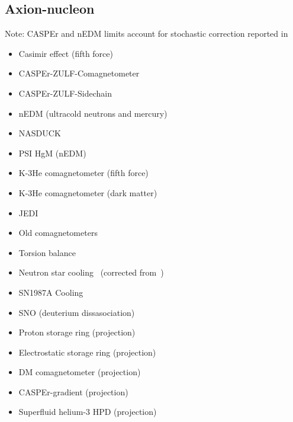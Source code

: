 \documentclass[8pt,twocolumn]{extarticle}
\begin{document}
\begin{mdframed}
\vspace{-1em}
\section{Axion-nucleon}\vspace{-0.5em}
Note: CASPEr and nEDM limits account for stochastic correction reported in~\cite{Centers:2019dyn}
\begin{itemize}\setlength\itemsep{-0.5em}
	\item Casimir effect (fifth force)~\cite{Mostepanenko:2020lqe}
    \item CASPEr-ZULF-Comagnetometer~\cite{Wu:2019exd}
    \item CASPEr-ZULF-Sidechain~\cite{Garcon:2019inh}
    \item nEDM (ultracold neutrons and mercury)~\cite{Abel:2017rtm}
    \item NASDUCK~\cite{Bloch:2021vnn,Bloch:2022kjm}
    \item PSI HgM (nEDM)~\cite{Abel:2022vfg}
    \item K-3He comagnetometer (fifth force)~\cite{Vasilakis2009}
    \item K-3He comagnetometer (dark matter)~\cite{Lee:2022vvb}
    	\item JEDI~\cite{JEDI:2022hxa}
    \item Old comagnetometers~\cite{Bloch:2019lcy}
    \item Torsion balance~\cite{Adelberger:2006dh}
    \item Neutron star cooling~\cite{Buschmann:2021juv} (corrected from~\cite{Beznogov:2018fda})
    \item SN1987A Cooling~\cite{Carenza:2019pxu}
    \item SNO (deuterium dissasociation)~\cite{Bhusal:2020bvx}
    \item Proton storage ring (projection)~\cite{Graham:2020kai}
    \item Electrostatic storage ring (projection)~\cite{Brandenstein:2022eif}
    \item DM comagnetometer (projection)~\cite{Bloch:2019lcy}
    \item CASPEr-gradient (projection)~\cite{Garcon:2019inh}
    \item Superfluid helium-3 HPD (projection)~\cite{Gao:2022nuq}
\end{itemize}
\end{mdframed}

\newpage
\end{document}
